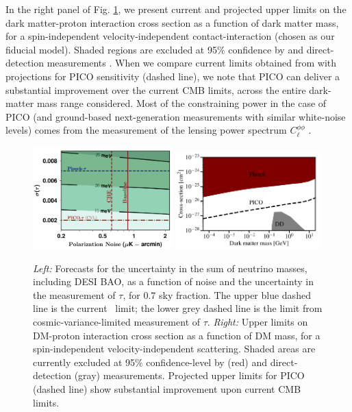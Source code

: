 \documentclass[PICOReport.tex]{subfiles}
\begin{document}
In the right panel of Fig. \ref{fig:DM_baryons}, we present current and projected upper limits on the dark matter-proton interaction cross section as a function of dark matter mass, for a spin-independent velocity-independent contact-interaction (chosen as our fiducial model). Shaded regions are excluded at 95$\%$ confidence by {\planck} \cite{2018PhRvL.121h1301G} and direct-detection measurements \cite{2018PhRvD..97l3013K}. When we compare current limits obtained from {\planck} with projections for PICO sensitivity (dashed line), we note that PICO can deliver a substantial improvement over the current CMB limits, across the entire dark-matter mass range considered.  Most of the constraining power in the case of PICO (and ground-based next-generation measurements with similar white-noise levels) comes from the measurement of the lensing power spectrum $C_\ell^{\phi \phi}$ \cite{2018arXiv180610165L}.
%
\begin{figure}[t]
\begin{center}
\includegraphics[width=0.48\textwidth]{images/Mnu_tauprior_final.pdf}
\includegraphics[width=0.50\textwidth]{images/pico_dd3.pdf}
\caption{\captiontext   
\textit{Left:}  Forecasts for the uncertainty in the sum of 
neutrino masses, including DESI BAO, as a function of noise and the uncertainty in the measurement of $\tau$, 
for 0.7 sky fraction.  The upper blue dashed line is the current \planck~limit; the lower grey dashed line is the limit from cosmic-variance-limited measurement of $\tau$. \textit{Right:} Upper limits on DM-proton interaction cross section as a function of DM mass, for a spin-independent velocity-independent scattering. Shaded areas are currently excluded at 95$\%$ confidence-level by {\planck} (red) \cite{2018PhRvL.121h1301G} and direct-detection (gray) \cite{2018PhRvD..97l3013K} measurements.
Projected upper limits for PICO (dashed line) show substantial improvement upon current CMB limits.}\label{fig:DM_baryons}
\end{center}
\vspace{-0.15in}
\end{figure}
%
\end{document}
